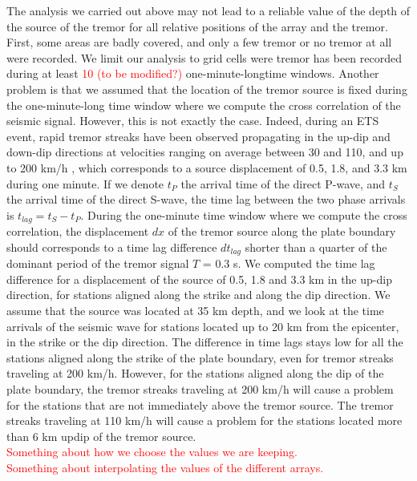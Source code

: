 \documentclass[draft]{agujournal2019}
\begin{document}
The analysis we carried out above may not lead to a reliable value of the depth of the source of the tremor for all relative positions of the array and the tremor. First, some areas are badly covered, and only a few tremor or no tremor at all were recorded. We limit our analysis to grid cells were tremor has been recorded during at least \textcolor{red}{10 (to be modified?)} one-minute-longtime windows. Another problem is that we assumed that the location of the tremor source is fixed during the one-minute-long time window where we compute the cross correlation of the seismic signal. However, this is not exactly the case. Indeed, during an ETS event, rapid tremor streaks have been observed propagating in the up-dip and down-dip directions at velocities ranging on average between 30 and 110, and up to 200 km/h \cite{GHO_2010_G3}, which corresponds to a source displacement of 0.5, 1.8, and 3.3 km during one minute. If we denote $t_P$ the arrival time of the direct P-wave, and $t_S$ the arrival time of the direct S-wave, the time lag between the two phase arrivals is $t_{lag} = t_S - t_P$. During the one-minute time window where we compute the cross correlation, the displacement $dx$ of the tremor source along the plate boundary should corresponds to a time lag difference $dt_{lag}$ shorter than a quarter of the dominant period of the tremor signal $T$ = 0.3 s. We computed the time lag difference for a displacement of the source of 0.5, 1.8 and 3.3 km in the up-dip direction, for stations aligned along the strike and along the dip direction. We assume that the source was located at 35 km depth, and we look at the time arrivals of the seismic wave for stations located up to 20 km from the epicenter, in the strike or the dip direction. The difference in time lags stays low for all the stations aligned along the strike of the plate boundary, even for tremor streaks traveling at 200 km/h. However, for the stations aligned along the dip of the plate boundary, the tremor streaks traveling at 200 km/h will cause a problem for the stations that are not immediately above the tremor source. The tremor streaks traveling at 110 km/h will cause a problem for the stations located more than 6 km updip of the tremor source. \\

\textcolor{red}{Something about how we choose the values we are keeping.} \\

\textcolor{red}{Something about interpolating the values of the different arrays.} \\
\end{document}
